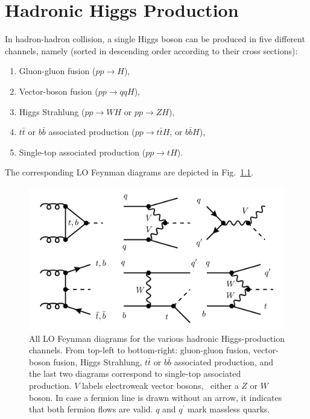 
\chapter{Hadronic Higgs Production}\label{chap:four}
In hadron-hadron collision, a single Higgs boson can be produced in five different channels, namely (sorted in descending order according to their cross sections):
\begin{enumerate}
  \item Gluon-gluon fusion ($pp \rightarrow H$),
  \item Vector-boson fusion ($pp \rightarrow qqH$),
  \item Higgs Strahlung ($pp \rightarrow WH$ or $pp \rightarrow Z H$),
  \item $t \bar{t}$ or $b \bar{b}$ associated production ($pp \rightarrow t \bar{t} H$, or $b \bar{b} H$),
  \item Single-top associated production ($pp \rightarrow t H$).
\end{enumerate}
The corresponding \acs{LO} Feynman diagrams are depicted in Fig.~\ref{fig:4:channels}.
\begin{figure}[h]
\centering
\includegraphics[scale=0.38]{Images/channels.pdf}
\caption{All \acs{LO} Feynman diagrams for the various hadronic Higgs-production channels. From top-left to bottom-right: gluon-gluon fusion, vector-boson fusion, Higgs Strahlung, $t \bar{t}$ or $b \bar{b}$ associated production, and the last two diagrams correspond to single-top associated production. $V$ labels electroweak vector bosons, \ie\ either a $Z$ or $W$ boson. In case a fermion line is drawn without an arrow, it indicates that both fermion flows are valid. $q$ and $q^\prime$ mark massless quarks.}
\label{fig:4:channels}
\end{figure}
